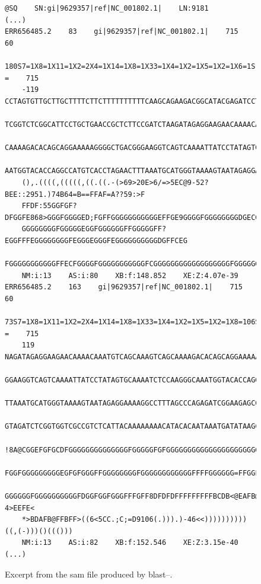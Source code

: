 \begin{figure}[H]
\begin{lstlisting}[basicstyle=\ttfamily\footnotesize,frameround=ftft,frame=trBL]
@SQ    SN:gi|9629357|ref|NC_001802.1|    LN:9181
(...)
ERR656485.2    83    gi|9629357|ref|NC_001802.1|    715    60
    180S7=1X8=1X11=1X2=2X4=1X14=1X8=1X33=1X4=1X2=1X5=1X2=1X6=1S    =	715
    -119    CCTAGTGTTGCTTGCTTTTCTTCTTTTTTTTTTCAAGCAGAAGACGGCATACGAGATCCTCTATCGAGA
    TCGGTCTCGGCATTCCTGCTGAACCGCTCTTCCGATCTAAGATAGAGGAAGAACAAAACAAATGTCAGCAAAGTCAG
    CAAAAGACACAGCAGGAAAAAGGGGCTGACGGGAAGGTCAGTCAAAATTATCCTATAGTGCAAAATCTCCAAGGGCA
    AATGGTACACCAGGCCATGTCACCTAGAACTTTAAATGCATGGGTAAAAGTAATAGAGGAAAAGGCCTTTAGCCCAN
    (),.((((,(((((,((.((.-(>69>20E>6/=>5EC@9-52?BEE::2951.)74B64=B==FFAF=A??59:>F
    FFDF:55GGFGF?DFGGFE868>GGGFGGGGED;FGFFGGGGGGGGGGGEFFGE9GGGGFGGGGGGGGDGECGGFGG
    GGGGGGGGFGGGGGEGGFGGGGGGFFGGGGGFF?EGGFFFEGGGGGGGGFEGGGEGGGFEGGGGGGGGGGDGFFCEG
    FGGGGGGGGGGGFFECFGGGGFGGGGGGGGGGGFCGGGGGGGGGGGGGGGGGGFGGGGGGGGF@CCA8!
    NM:i:13    AS:i:80    XB:f:148.852    XE:Z:4.07e-39
ERR656485.2    163    gi|9629357|ref|NC_001802.1|    715    60
    73S7=1X8=1X11=1X2=2X4=1X14=1X8=1X33=1X4=1X2=1X5=1X2=1X8=106S    =    715
    119    NAGATAGAGGAAGAACAAAACAAATGTCAGCAAAGTCAGCAAAAGACACAGCAGGAAAAAGGGGCTGACG
    GGAAGGTCAGTCAAAATTATCCTATAGTGCAAAATCTCCAAGGGCAAATGGTACACCAGGCCATGTCACCTAGAACT
    TTAAATGCATGGGTAAAAGTAATAGAGGAAAAGGCCTTTAGCCCAGAGATCGGAAGAGCGTCGTGTAGGGAAAGAGT
    GTAGATCTCGGTGGTCGCCGTCTCATTACAAAAAAAACATACACAATAAATGATATAAGCGGAATCAACAGCATGA
    !8A@CGGEFGFGCDFGGGGGGGGGGGGGGFGGGGGFGFGGGGGGGGGGGGGGGGGGGGGGGGEGGGGGGGGGGGGGG
    FGGFGGGGGGGGGEGFGFGGGFFGGGGGGGGFGGGGGGGGGGGGFFFFGGGGGG=FFGGFFDGGGGGGGG8FGFGGG
    GGGGGGFGGGGGGGGGGFDGGFGGFGGGFFFGFF8DFDFDFFFFFFFFFBCDB<@EAFB@ABAC@CDFF?4>EEFE<
    *>BDAFB@FFBFF>((6<5CC.;C;=D9106(.))).)-46<<))))))))))((,(-)))()((()))
    NM:i:13    AS:i:82    XB:f:152.546    XE:Z:3.15e-40
(...)
\end{lstlisting}
\caption{Excerpt from the \acrshort{sam} file produced by \acrshort{blast}--\blastobam{}.}\label{fig:samBLAST}
\end{figure}

